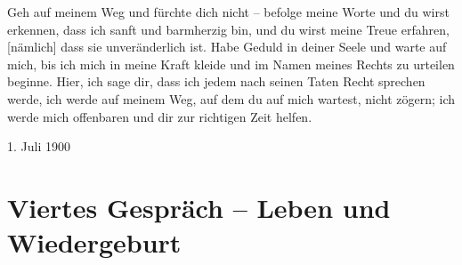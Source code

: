 Geh auf meinem Weg und fürchte dich nicht -- befolge meine Worte und du wirst erkennen, dass ich sanft und barmherzig bin, und du wirst meine Treue erfahren, [nämlich] dass sie unveränderlich ist. Habe Geduld in deiner Seele und warte auf mich, bis ich mich in meine Kraft kleide und im Namen meines Rechts zu urteilen beginne. Hier, ich sage dir, dass ich jedem nach seinen Taten Recht sprechen werde, ich werde auf meinem Weg, auf dem du auf mich wartest, nicht zögern; ich werde mich offenbaren und dir zur richtigen Zeit helfen. 



1. Juli 1900




\section{Viertes Gespräch -- Leben und Wiedergeburt}

